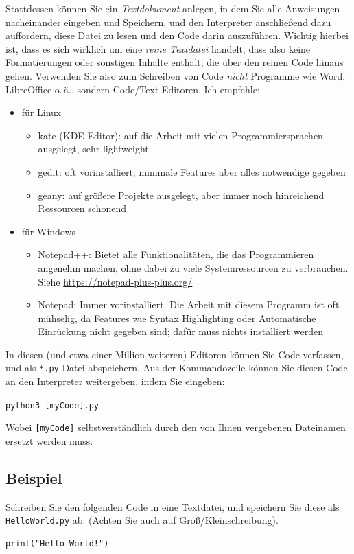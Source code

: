 Stattdessen können Sie ein \emph{Textdokument} anlegen, in dem Sie alle Anweisungen nacheinander eingeben und Speichern, und den Interpreter anschließend dazu auffordern, diese Datei zu lesen und den Code darin auszuführen. Wichtig hierbei ist, dass es sich wirklich um eine \emph{reine Textdatei} handelt, dass also keine Formatierungen oder sonstigen Inhalte enthält, die über den reinen Code hinaus gehen. Verwenden Sie also zum Schreiben von Code \emph{nicht} Programme wie Word, LibreOffice o.\,ä., sondern Code/Text-Editoren. Ich empfehle:
\begin{itemize}
\item für Linux
	\begin{itemize}
	\item kate (KDE-Editor): auf die Arbeit mit vielen Programmiersprachen ausgelegt, sehr lightweight
	\item gedit: oft vorinstalliert, minimale Features aber alles notwendige gegeben
	\item geany: auf größere Projekte ausgelegt, aber immer noch hinreichend Ressourcen schonend
	\end{itemize}
\item für Windows
	\begin{itemize}
	\item Notepad++: Bietet alle Funktionalitäten, die das Programmieren angenehm machen, 
		ohne dabei zu viele Systemressourcen zu verbrauchen.\\
		Siehe \url{https://notepad-plus-plus.org/}
	\item Notepad: Immer vorinstalliert. Die Arbeit mit diesem Programm ist oft mühselig, da Features
		wie Syntax Highlighting oder Automatische Einrückung nicht gegeben sind; dafür muss nichts
		installiert werden
	\end{itemize}
\end{itemize}

In diesen (und etwa einer Million weiteren) Editoren können Sie Code verfassen, und als \texttt{*.py}-Datei abspeichern. Aus der Kommandozeile können Sie diesen Code an den Interpreter weitergeben, indem Sie eingeben:
\begin{center}
\texttt{python3 [myCode].py}
\end{center}
Wobei \texttt{[myCode]} selbstverständlich durch den von Ihnen vergebenen Dateinamen ersetzt werden muss.


\subsection{Beispiel}
Schreiben Sie den folgenden Code in eine Textdatei, und speichern Sie diese als \texttt{HelloWorld.py} ab. (Achten Sie auch auf Groß/Kleinschreibung).
\begin{codebox}
\begin{verbatim}
print("Hello World!")
\end{verbatim}
\end{codebox}

